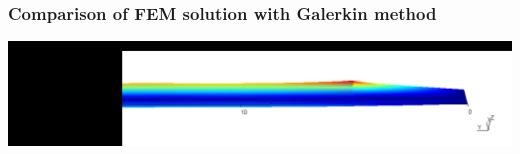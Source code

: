 \documentclass[9pt]{beamer}
\begin{document}

%

\begin{frame}
\frametitle{Comparison of FEM solution with Galerkin method }

\begin{figure}[h!]
\centering

\end{figure}
\href{run:galcomp.mpg}{\includegraphics[width=1.0\textwidth,trim={10.5cm 0cm 0cm 2cm},clip]{galcomp.png}}




\end{frame}
\end{document}
